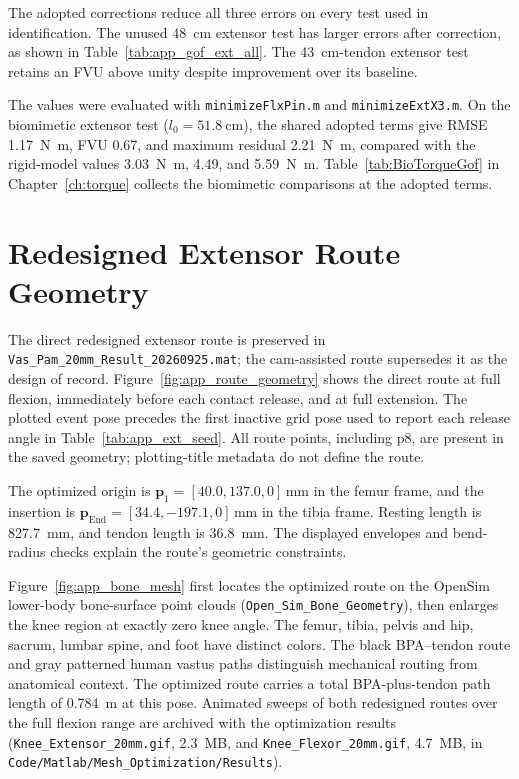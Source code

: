 The adopted corrections reduce all three errors on every test used in identification. The unused \qty{48}{\cm} extensor test has larger errors after correction, as shown in Table~\ref{tab:app_gof_ext_all}. The \qty{43}{\cm}-tendon extensor test retains an FVU above unity despite improvement over its baseline.

The values were evaluated with \nolinkurl{minimizeFlxPin.m} and \nolinkurl{minimizeExtX3.m}. On the biomimetic extensor test ($l_0=\qty{51.8}{\cm}$), the shared adopted terms give RMSE \qty{1.17}{\N\m}, FVU 0.67, and maximum residual \qty{2.21}{\N\m}, compared with the rigid-model values \qty{3.03}{\N\m}, 4.49, and \qty{5.59}{\N\m}. Table~\ref{tab:BioTorqueGof} in Chapter~\ref{ch:torque} collects the biomimetic comparisons at the adopted terms.

\section{Redesigned Extensor Route Geometry}\label{app:route_geometry}

The direct redesigned extensor route is preserved in \nolinkurl{Vas_Pam_20mm_Result_20260925.mat}; the cam-assisted route supersedes it as the design of record. Figure~\ref{fig:app_route_geometry} shows the direct route at full flexion, immediately before each contact release, and at full extension. The plotted event pose precedes the first inactive grid pose used to report each release angle in Table~\ref{tab:app_ext_seed}. All route points, including p8, are present in the saved geometry; plotting-title metadata do not define the route.

The optimized origin is $\mathbf p_1=[40.0,137.0,0]\,\unit{\mm}$ in the femur frame, and the insertion is $\mathbf p_{\mathrm{End}}=[34.4,-197.1,0]\,\unit{\mm}$ in the tibia frame. Resting length is \qty{827.7}{\mm}, and tendon length is \qty{36.8}{\mm}. The displayed envelopes and bend-radius checks explain the route's geometric constraints.

Figure~\ref{fig:app_bone_mesh} first locates the optimized route on the OpenSim lower-body bone-surface point clouds (\texttt{Open\_Sim\_Bone\_Geometry}), then enlarges the knee region at exactly zero knee angle. The femur, tibia, pelvis and hip, sacrum, lumbar spine, and foot have distinct colors. The black BPA--tendon route and gray patterned human vastus paths distinguish mechanical routing from anatomical context. The optimized route carries a total BPA-plus-tendon path length of \qty{0.784}{\m} at this pose. Animated sweeps of both redesigned routes over the full flexion range are archived with the optimization results (\texttt{Knee\_Extensor\_20mm.gif}, 2.3~MB, and \texttt{Knee\_Flexor\_20mm.gif}, 4.7~MB, in \texttt{Code/Matlab/Mesh\_Optimization/Results}).

